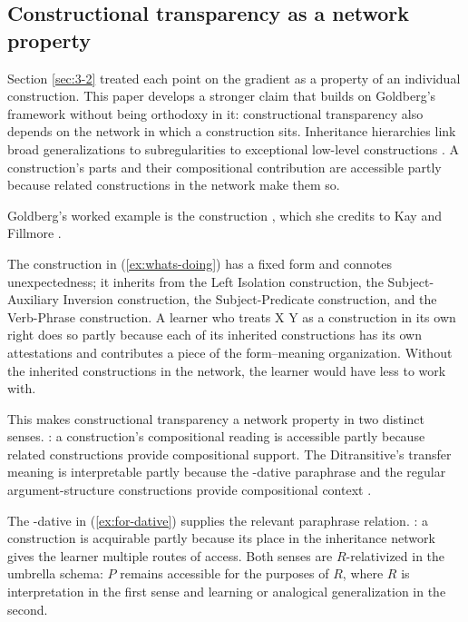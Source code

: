 \subsection{Constructional transparency as a network property}\label{sec:3-3}

Section \ref{sec:3-2} treated each point on the gradient as a property of an individual construction. This paper develops a stronger claim that builds on Goldberg's framework without being orthodoxy in it: constructional transparency also depends on the network in which a construction sits. Inheritance hierarchies link broad generalizations to subregularities to exceptional low-level constructions \autocite[14]{goldberg-2006-constructions-at-work}. A construction's parts and their compositional contribution are accessible partly because related constructions in the network make them so.

Goldberg's worked example is the  construction \autocite[14]{goldberg-2006-constructions-at-work}, which she credits to Kay and Fillmore \autocite{kay-fillmore-1999-whats-x-doing-y}.

\ea\label{ex:whats-doing}
\z

The construction in (\ref{ex:whats-doing}) has a fixed form and connotes unexpectedness; it inherits from the Left Isolation construction, the Subject-Auxiliary Inversion construction, the Subject-Predicate construction, and the Verb-Phrase construction. A learner who treats  X  Y as a construction in its own right does so partly because each of its inherited constructions has its own attestations and contributes a piece of the form--meaning organization. Without the inherited constructions in the network, the learner would have less to work with.

This makes constructional transparency a network property in two distinct senses. : a construction's compositional reading is accessible partly because related constructions provide compositional support. The Ditransitive's transfer meaning is interpretable partly because the -dative paraphrase and the regular argument-structure constructions provide compositional context \autocite[10]{goldberg-2006-constructions-at-work}.

\ea\label{ex:for-dative}
\z

The -dative in (\ref{ex:for-dative}) supplies the relevant paraphrase relation. : a construction is acquirable partly because its place in the inheritance network gives the learner multiple routes of access. Both senses are $R$-relativized in the umbrella schema: $P$ remains accessible for the purposes of $R$, where $R$ is interpretation in the first sense and learning or analogical generalization in the second.

